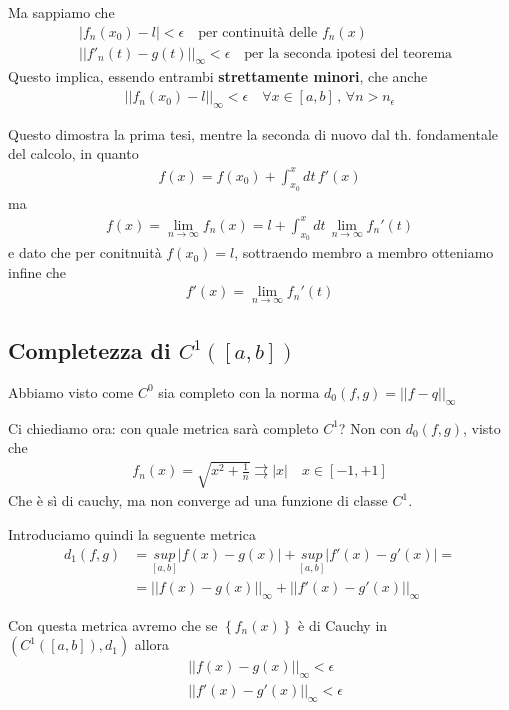 Ma sappiamo che
\begin{align}
	{}& |f_n(x_0) - l|<\epsilon \quad \text{per continuità delle } f_n(x)\\
	& ||f'_n(t) - g(t)||_\infty <\epsilon \quad \text{per la seconda ipotesi del teorema}
\end{align}
Questo implica, essendo entrambi \textbf{strettamente minori}, che anche
\begin{align}
	||f_n(x_0) - l||_\infty<\epsilon \quad \forall x\in[a,b]\, , \, \forall n>n_\epsilon
\end{align}

Questo dimostra la prima tesi, mentre la seconda di nuovo dal th. fondamentale del calcolo, in quanto
\begin{align}
	f(x)=f(x_0) + \int_{x_0}^{x} dt \, f'(x)
\end{align}
ma
\begin{align}
	f(x)= \underset{n\rightarrow \infty}{\lim} f_n(x)= l +  \int_{x_0}^{x} dt \, \underset{n\rightarrow \infty}{\lim} f_n'(t)
\end{align}
e dato che per conitnuità $f(x_0)=l$, sottraendo membro a membro otteniamo infine che
\begin{align}
	f'(x) = \underset{n\rightarrow \infty}{\lim} f_n'(t)
\end{align}

\newpage

\subsection{Completezza di $C^1([a,b])$}

Abbiamo visto come $C^0$ sia completo con la norma $d_0(f,g)=||f-q||_\infty$

Ci chiediamo ora: con quale metrica sarà completo $C^1$? Non con $d_0(f,g)$, visto che
\begin{align}
	f_n(x)= \sqrt{x^2 + \frac{1}{n}} \rightrightarrows |x| \quad x\in[-1,+1]
\end{align} 
Che è sì di cauchy, ma non converge ad una funzione di classe $C^1$.

Introduciamo quindi la seguente metrica
\begin{align}
	d_1(f,g) {}&= \underset{[a,b]}{sup}|f(x)-g(x)|+\underset{[a,b]}{sup}|f'(x)-g'(x)| = \\ 
	&=||f(x)-g(x)||_\infty + ||f'(x)-g'(x)||_\infty
\end{align}

Con questa metrica avremo che se $\left\{f_n(x)\right\}$ è di Cauchy in $(C^1([a,b]),d_1)$ allora
\begin{align}
	{}&||f(x)-g(x)||_\infty < \epsilon \\
	&||f'(x)-g'(x)||_\infty < \epsilon
\end{align}

